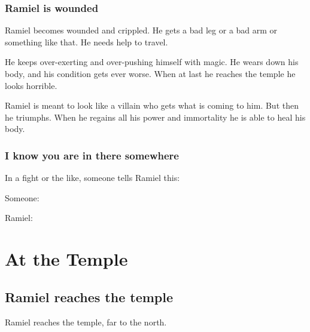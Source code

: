\subsubsection{Ramiel is wounded}
Ramiel becomes wounded and crippled. 
He gets a bad leg or a bad arm or something like that.
He needs help to travel.

He keeps over-exerting and over-pushing himself with magic.
He wears down his body, and his condition gets ever worse.
When at last he reaches the temple he looks horrible.

Ramiel is meant to look like a villain who gets what is coming to him. 
But then he triumphs.
When he regains all his \resphan power and immortality he is able to heal his body.





\subsubsection{I know you are in there somewhere}
In a fight or the like, someone tells Ramiel this: 

\begin{prose}
  Someone: 
  
  Ramiel: 
\end{prose}















\section{At the Temple}
\subsection{Ramiel reaches the temple}
Ramiel reaches the temple, far to the north. 





